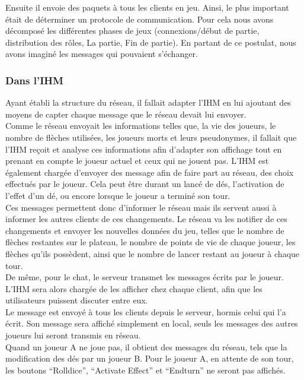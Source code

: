 \documentclass[a4paper,11pt]{article}
\begin{document}
Ensuite il envoie des paquets à tous les clients en jeu. Ainsi, le plus important était de déterminer un protocole de communication. Pour cela nous avons décomposé les différentes phases de jeux (connexions/début de partie, distribution des rôles, La partie, Fin de partie). En partant de ce postulat, nous avons imaginé les messages qui pouvaient s’échanger.

\newpage


\subsubsection{Dans l'IHM}

Ayant établi la structure du réseau, il fallait adapter l'IHM en lui ajoutant des moyens de capter chaque message que le réseau devait lui envoyer. \\

Comme le réseau envoyait les informations telles que, la vie des joueurs, le nombre de flèches utilisées, les joueurs morts et leurs pseudonymes, il fallait que l’IHM reçoit et analyse ces informations afin d’adapter son affichage tout en prenant en compte le joueur actuel et ceux qui ne jouent pas.
L’IHM est également chargée d’envoyer des message afin de faire part au réseau, des choix effectués par le joueur. Cela peut être durant un lancé de dés, l’activation de l'effet d’un dé, ou encore lorsque le joueur a terminé son tour. \\

Ces messages permettent donc d’informer le réseau mais ils servent aussi à informer les autres clients de ces changements. Le réseau va les notifier de ces changements et envoyer les nouvelles données du jeu, telles que le nombre de flèches restantes sur le plateau, le nombre de points de vie de chaque joueur, les flèches qu’ils possèdent, ainsi que le nombre de lancer restant au joueur à chaque tour. \\

De même, pour le chat, le serveur transmet les messages écrits par le joueur. L’IHM sera alors chargée de les afficher chez chaque client, afin que les utilisateurs puissent discuter entre eux. \\
	
Le message est envoyé à tous les clients depuis le serveur, hormis celui qui l’a écrit. Son message sera affiché simplement en local, seuls les messages des autres joueurs lui seront transmis en réseau. \\

Quand un joueur A ne joue pas, il obtient des messages du réseau, tels que la modification des dés par un joueur B. Pour le joueur A, en attente de son tour, les boutons “Rolldice”, “Activate Effect” et “Endturn” ne seront pas affichés.
\end{document}
